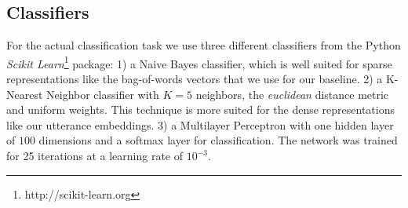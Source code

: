 

\subsection{Classifiers}
For the actual classification task we use three different classifiers from the Python \emph{Scikit Learn}\footnote{http://scikit-learn.org} package:
1) a Naive Bayes classifier, which is well suited for sparse representations like the bag-of-words vectors that we use for our baseline.
2) a K-Nearest Neighbor classifier with $K=5$ neighbors, the \emph{euclidean} distance metric and uniform weights.
This technique is more suited for the dense representations like our utterance embeddings.
3) a Multilayer Perceptron with one hidden layer of $100$ dimensions and a softmax layer for classification.
The network was trained for 25 iterations at a learning rate of $10^{-3}$.
